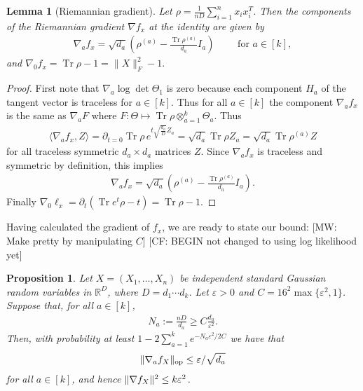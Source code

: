 \documentclass[aos]{imsart}
\newtheorem{prop}[theorem]{Proposition}
\newtheorem{lemma}[theorem]{Lemma}
\theoremstyle{definition}
\numberwithin{equation}{section}
\DeclareMathOperator{\op}{op}
\DeclareMathOperator{\tr}{Tr}
\DeclarePairedDelimiter{\norm}{\lVert}{\rVert}
\newcommand{\R}{{\mathbb{R}}}
\newcommand{\ot}{\otimes}
\newcommand{\eps}{\varepsilon}
\newcommand{\samp}{x}
\newcommand{\rv}{X}
\newcommand{\ef}{f}
\newcommand{\CF}[1]{{\color{purple}[CF: #1]}}
\newcommand{\MW}[1]{{\color{red}[MW: #1]}}
\begin{document}

\begin{lemma}[Riemannian gradient]\label{lem:gradient}
Let $\rho = \frac{1}{nD} \sum_{i=1}^n \samp_i \samp_i^T $.
Then the components of the Riemannian gradient $\nabla \ef_{\samp}$ at the identity are given by
\begin{align*}
 \nabla_a \ef_{\samp} = \sqrt{d_a}\left( \rho^{(a)} - \frac{\tr\rho^{(a)}}{d_a} I_a\right)
  \qquad \text{ for } a \in [k],
\end{align*}
and $\nabla_0 \ef_\samp = \tr \rho - 1 = \|X\|_F^2 - 1.$ 
\end{lemma}
\begin{proof}
First note that $\nabla_a \log \det \Theta_1$ is zero because each component $H_a$ of the tangent vector is traceless for $a \in [k]$. Thus for all $a\in[k]$ the component $\nabla_a f_\samp$ is the same as $\nabla_a F$ where $F:\Theta \mapsto \tr \rho \ot_{a = 1}^k \Theta_a$. Thus
  \begin{align*}
   \langle \nabla_a f_{\samp} , Z \rangle
  =  \partial_{t=0} \tr \rho \, e^{t \sqrt{\frac{d_a}{D}} Z_a}
  = \sqrt{d_a} \tr \rho Z_a
  = \sqrt{d_a} \tr \rho^{(a)} Z
  \end{align*}
  for all traceless symmetric $d_a \times d_a$ matrices $Z$.
  Since $\nabla_a f_{\samp}$ is traceless and symmetric by definition, this implies
  \begin{align*}
    \nabla_a f_{\samp}
  = \sqrt{d_a}\left( \rho^{(a)} - \frac{\tr\rho^{(a)}}{d_a} I_a\right).
  \end{align*}
 Finally $\nabla_0 \ell_\samp = \partial_t (\tr e^{t} \rho - t) = \tr \rho - 1.$
\end{proof}

Having calculated the gradient of $f_\samp$, we are ready to state our bound:
\MW{Make pretty by manipulating $C$} 
\CF{BEGIN not changed to using log likelihood yet}
\begin{prop}\label{prop:gradient-bound}
Let $\rv = (\rv_1,\dots,\rv_n)$ be independent standard Gaussian random variables in $\R^D$, where $D=d_1\cdots{}d_k$.
Let $\eps>0$ and $C = 16^2\max\{\eps^2,1\}$.
Suppose that, for all $a \in [k]$,
\begin{align*}
  N_a := \frac{n D}{d_a} \geq C \frac{d_a}{\eps^2}.
\end{align*}
Then, with probability at least $1 - 2 \sum_{a=1}^k e^{-N_a \eps^2/2C}$ we have that
\begin{align*}
\norm{\nabla_a f_{\rv}}_{\op} \leq \eps/\sqrt{d_a}
\end{align*}
for all $a\in[k]$, and hence $\norm{\nabla f_{\rv}}^2 \leq k \eps^2$.
\end{prop}
\end{document}
